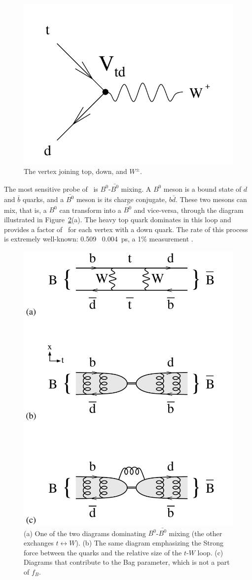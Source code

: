\documentclass{cornell}
\begin{document}
\begin{figure}[t]
  \begin{center}
    \includegraphics[width=0.4\linewidth]{plots/vtdvertex}
  \end{center}
  \caption[Vertex joining top, down, and $W^\pm$]{\label{vtdvertex}
  The vertex joining top, down, and $W^\pm$.}
\end{figure}

The most sensitive probe of \vtd\ is $B^0$-$\bar{B^0}$ mixing.  A
$B^0$ meson is a bound state of $d$ and $\bar{b}$ quarks, and a
$\bar{B^0}$ meson is its charge conjugate, $b\bar{d}$.  These two
mesons can mix, that is, a $B^0$ can transform into a $\bar{B^0}$ and
vice-versa, through the diagram illustrated in
Figure~\ref{bmixing}(a).  The heavy top quark dominates in this loop
and provides a factor of \vtd\ for each vertex with a down quark.  The
rate of this process is extremely well-known: 0.509 \PM\ 0.004~ps\inv,
a 1\% measurement \cite{hfag}.

\begin{figure}[p]
  \begin{center}
    \includegraphics[width=0.7\linewidth]{plots/bmixing}
  \end{center}
  \caption[$B^0$-$\bar{B^0}$ mixing diagrams and the meaning of
  $f_B$]{\label{bmixing} (a) One of the two diagrams dominating
  $B^0$-$\bar{B^0}$ mixing (the other exchanges $t \leftrightarrow
  W$).  (b) The same diagram emphasizing the Strong force between the
  quarks and the relative size of the $t$-$W$ loop.  (c) Diagrams that
  contribute to the Bag parameter, which is not a part of $f_B$.}
\end{figure}
\end{document}
